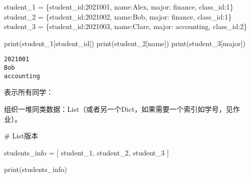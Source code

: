 \documentclass[
  letterpaper,
  DIV=11,
  numbers=noendperiod]{scrreprt}
\newenvironment{Shaded}{\begin{snugshade}}{\end{snugshade}}
\newcommand{\BuiltInTok}[1]{\textcolor[rgb]{0.00,0.23,0.31}{#1}}
\newcommand{\CommentTok}[1]{\textcolor[rgb]{0.37,0.37,0.37}{#1}}
\newcommand{\DecValTok}[1]{\textcolor[rgb]{0.68,0.00,0.00}{#1}}
\newcommand{\NormalTok}[1]{\textcolor[rgb]{0.00,0.23,0.31}{#1}}
\newcommand{\OperatorTok}[1]{\textcolor[rgb]{0.37,0.37,0.37}{#1}}
\newcommand{\StringTok}[1]{\textcolor[rgb]{0.13,0.47,0.30}{#1}}
\begin{document}
\begin{Shaded}
\begin{Highlighting}[]
\NormalTok{student\_1 }\OperatorTok{=}\NormalTok{ \{}\StringTok{\textquotesingle{}student\_id\textquotesingle{}}\NormalTok{:}\DecValTok{2021001}\NormalTok{, }\StringTok{\textquotesingle{}name\textquotesingle{}}\NormalTok{:}\StringTok{\textquotesingle{}Alex\textquotesingle{}}\NormalTok{, }\StringTok{\textquotesingle{}major\textquotesingle{}}\NormalTok{: }\StringTok{\textquotesingle{}finance\textquotesingle{}}\NormalTok{, }\StringTok{\textquotesingle{}class\_id\textquotesingle{}}\NormalTok{:}\DecValTok{1}\NormalTok{\}}
\NormalTok{student\_2 }\OperatorTok{=}\NormalTok{ \{}\StringTok{\textquotesingle{}student\_id\textquotesingle{}}\NormalTok{:}\DecValTok{2021002}\NormalTok{, }\StringTok{\textquotesingle{}name\textquotesingle{}}\NormalTok{:}\StringTok{\textquotesingle{}Bob\textquotesingle{}}\NormalTok{, }\StringTok{\textquotesingle{}major\textquotesingle{}}\NormalTok{: }\StringTok{\textquotesingle{}finance\textquotesingle{}}\NormalTok{, }\StringTok{\textquotesingle{}class\_id\textquotesingle{}}\NormalTok{:}\DecValTok{1}\NormalTok{\}}
\NormalTok{student\_3 }\OperatorTok{=}\NormalTok{ \{}\StringTok{\textquotesingle{}student\_id\textquotesingle{}}\NormalTok{:}\DecValTok{2021003}\NormalTok{, }\StringTok{\textquotesingle{}name\textquotesingle{}}\NormalTok{:}\StringTok{\textquotesingle{}Clare\textquotesingle{}}\NormalTok{, }\StringTok{\textquotesingle{}major\textquotesingle{}}\NormalTok{: }\StringTok{\textquotesingle{}accounting\textquotesingle{}}\NormalTok{, }\StringTok{\textquotesingle{}class\_id\textquotesingle{}}\NormalTok{:}\DecValTok{2}\NormalTok{\}}


\BuiltInTok{print}\NormalTok{(student\_1[}\StringTok{\textquotesingle{}student\_id\textquotesingle{}}\NormalTok{])}
\BuiltInTok{print}\NormalTok{(student\_2[}\StringTok{\textquotesingle{}name\textquotesingle{}}\NormalTok{])}
\BuiltInTok{print}\NormalTok{(student\_3[}\StringTok{\textquotesingle{}major\textquotesingle{}}\NormalTok{])}
\end{Highlighting}
\end{Shaded}

\begin{verbatim}
2021001
Bob
accounting
\end{verbatim}

表示所有同学：

组织一堆同类数据：List（或者另一个Dict，如果需要一个索引如学号，见作业）。

\begin{Shaded}
\begin{Highlighting}[]
\CommentTok{\# List版本}

\NormalTok{students\_info }\OperatorTok{=}\NormalTok{ [}
\NormalTok{  student\_1,}
\NormalTok{  student\_2,}
\NormalTok{  student\_3}
\NormalTok{]}

\BuiltInTok{print}\NormalTok{(students\_info)}
\end{Highlighting}
\end{Shaded}
\end{document}

